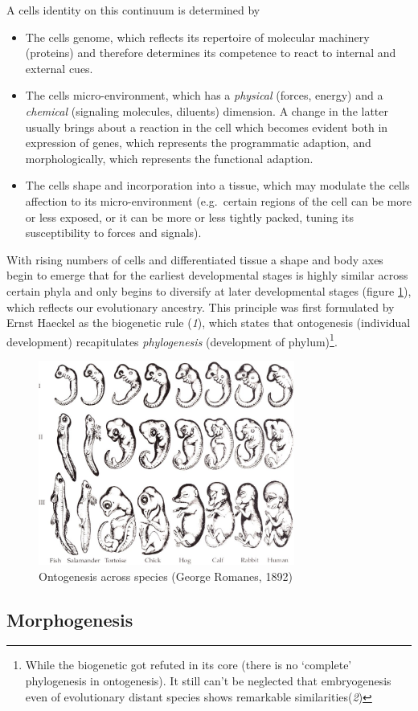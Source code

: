 \documentclass[11pt,singlespacinge,twoside]{reedthesis} %
\providecommand{\tightlist}{%
  \setlength{\itemsep}{0pt}\setlength{\parskip}{0pt}}
\begin{document}
A cells identity on this continuum is determined by
\begin{itemize}
\tightlist
\item
  The cells genome, which reflects its repertoire of molecular machinery (proteins) and therefore determines its competence to react to internal and external cues.
\item
  The cells micro-environment, which has a \emph{physical} (forces, energy) and a \emph{chemical} (signaling molecules, diluents) dimension. A change in the latter usually brings about a reaction in the cell which becomes evident both in expression of genes, which represents the programmatic adaption, and morphologically, which represents the functional adaption.
\item
  The cells shape and incorporation into a tissue, which may modulate the cells affection to its micro-environment (e.g.~certain regions of the cell can be more or less exposed, or it can be more or less tightly packed, tuning its susceptibility to forces and signals).
\end{itemize}
With rising numbers of cells and differentiated tissue a shape and body axes begin to emerge that for the earliest developmental stages is highly similar across certain phyla and only begins to diversify at later developmental stages (figure \ref{fig:heak}), which reflects our evolutionary ancestry. This principle was first formulated by Ernst Haeckel as the biogenetic rule (\emph{1}), which states that ontogenesis (individual development) recapitulates \emph{phylogenesis} (development of phylum)\footnote{While the biogenetic got refuted in its core (there is no `complete' phylogenesis in ontogenesis). It still can't be neglected that embryogenesis even of evolutionary distant species shows remarkable similarities(\emph{2})}.


\begin{figure}

{\centering \includegraphics[width=0.75\textwidth]{figures/intro/haekel} 

}

\caption[Ontogenesis across species]{Ontogenesis across species (George Romanes, 1892)}\label{fig:heak}
\end{figure}
\hypertarget{morphogenesis}{%
\subsection{Morphogenesis}\label{morphogenesis}}
\end{document}
